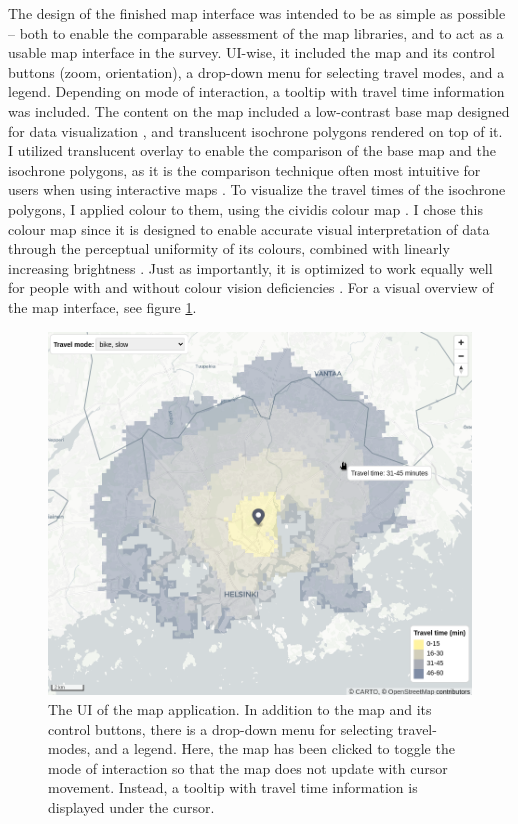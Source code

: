 The design of the finished map interface was intended to be as simple as possible --
both to enable the comparable assessment of the map libraries,
and to act as a usable map interface in the survey.
UI-wise, it included the map and its control buttons (zoom, orientation),
a drop-down menu for selecting travel modes, and a legend.
Depending on mode of interaction, a tooltip with travel time information was included.
The content on the map included
a low-contrast base map designed for data visualization \parencite{cartopositron},
and translucent isochrone polygons rendered on top of it.
I utilized translucent overlay to
enable the comparison of the base map and the isochrone polygons,
as it is the comparison technique
often most intuitive for users when using interactive maps
\parencite{lob2015}.
To visualize the travel times of the isochrone polygons,
I applied colour to them, using the cividis colour map \parencite{nun2018}.
I chose this colour map since it is designed to enable accurate visual
interpretation of data through the perceptual uniformity of its colours,
combined with linearly increasing brightness \parencite{nun2018}.
Just as importantly, it is optimized to work equally well
for people with and without colour vision deficiencies \parencite{nun2018}.
For a visual overview of the map interface, see figure \ref{fig:frontend screenshot}.

\begin{figure}[H]
	\centering
	\includegraphics[width=\textwidth]{visual/figures/screenshots/frontend.png}
	\caption{
		The UI of the map application.
		In addition to the map and its control buttons,
		there is a drop-down menu for selecting travel-modes, and a legend.
		Here, the map has been clicked to toggle the mode of interaction
		so that the map does not update with cursor movement.
		Instead, a tooltip with travel time information is displayed under the cursor.
	}
	\label{fig:frontend screenshot}
\end{figure}

